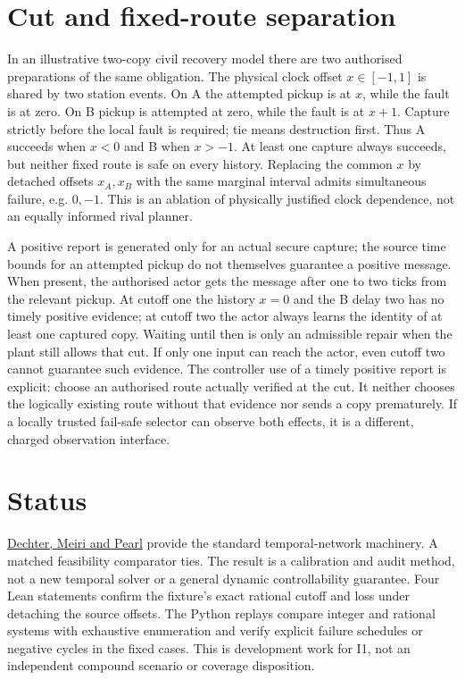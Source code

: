 \documentclass[11pt]{article}
\begin{document}
\section{Cut and fixed-route separation}
In an illustrative two-copy civil recovery model there are two
authorised preparations of the same obligation. The physical
clock offset \(x\in[-1,1]\) is shared by two station events.
On A the attempted pickup is at \(x\), while the fault is at
zero. On B pickup is attempted at zero, while the fault is at
\(x+1\). Capture strictly before the local fault is required;
tie means destruction first. Thus A succeeds when \(x<0\)
and B when \(x>-1\). At least one capture always succeeds,
but neither fixed route is safe on every history. Replacing
the common \(x\) by detached offsets \(x_A,x_B\) with the same
marginal interval admits simultaneous failure, e.g. \(0,-1\).
This is an ablation of physically justified clock dependence, not
an equally informed rival planner.

A positive report is generated only for an actual secure capture;
the source time bounds for an attempted pickup do not themselves
guarantee a positive message. When present, the authorised actor
gets the message after one to two ticks from the relevant pickup.
At cutoff one the history \(x=0\) and the B delay two has no timely
positive evidence; at cutoff two the actor always learns the
identity of at least one captured copy. Waiting until then is
only an admissible repair when the plant still allows that cut.
If only one input can reach the actor, even cutoff two cannot
guarantee such evidence. The controller use of a timely positive
report is explicit: choose an authorised route actually verified
at the cut. It neither chooses the logically existing route
without that evidence nor sends a copy prematurely. If a
locally trusted fail-safe selector can observe both effects, it
is a different, charged observation interface.

\section{Status}
\href{https://www.sciencedirect.com/science/article/pii/0004370291900066}{Dechter,
Meiri and Pearl} provide the standard temporal-network machinery.
A matched feasibility comparator ties. The result is a calibration
and audit method, not a new temporal solver or a general dynamic
controllability guarantee. Four Lean statements confirm the
fixture's exact rational cutoff and loss under detaching the
source offsets. The Python replays compare integer and rational
systems with exhaustive enumeration and verify explicit
failure schedules or negative cycles in the fixed cases.
This is development work for I1, not an independent compound
scenario or coverage disposition.
\end{document}
